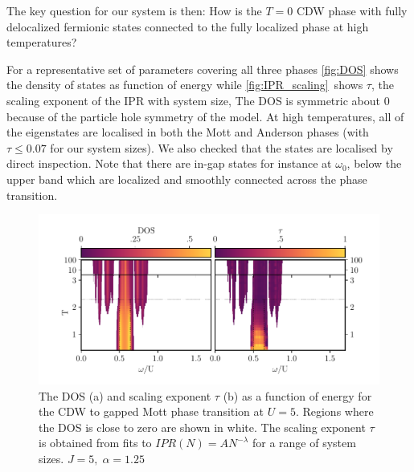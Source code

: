 The key question for our system is then: How is the \(T=0\) CDW phase with fully delocalized fermionic states connected to the fully localized phase at high temperatures?

For a representative set of parameters covering all three phases \cref{fig:DOS} shows the density of states as function of energy while \cref{fig:IPR_scaling}~shows \(\tau\), the scaling exponent of the IPR with system size, The DOS is symmetric about \(0\) because of the particle hole symmetry of the model. At high temperatures, all of the eigenstates are localised in both the Mott and Anderson phases (with \(\tau \leq 0.07\) for our system sizes). We also checked that the states are localised by direct inspection. Note that there are in-gap states for instance at \(\omega_0\), below the upper band which are localized and smoothly connected across the phase transition.

\hypertarget{fig:gap_opening_U5}{%
\begin{figure}
\centering
\includegraphics[width=1\textwidth,height=\textheight]{figure_code/fk_chapter/gap_opening/gap_opening_U5}
\caption[{DOS and Scaling Exponents for the transition from CDW to the Mott phase}]{The DOS (a) and scaling exponent \(\tau\) (b) as a function of energy for the CDW to gapped Mott phase transition at \(U=5\). Regions where the DOS is close to zero are shown in white. The scaling exponent \(\tau\) is obtained from fits to \(IPR(N) = A N^{-\lambda}\) for a range of system sizes. \(J = 5,\;\alpha = 1.25\)}
\label{fig:gap_opening_U5}
\end{figure}
}

